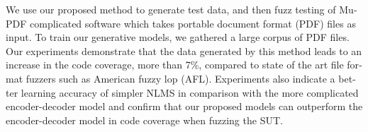 \begin{latin}
{		We use our proposed method to generate test data, and then fuzz testing of MuPDF complicated software which takes portable document format (PDF) files as input. 
		To train our generative models, we gathered a large corpus of PDF files.
		Our experiments demonstrate that the data generated by this method leads to an increase in the code coverage, more than 7\%, compared to state of the art file format fuzzers such as American fuzzy lop (AFL). Experiments also indicate a better learning accuracy of simpler NLMS in comparison with the more complicated encoder-decoder model and confirm that our proposed models can outperform the encoder-decoder model in code coverage when fuzzing the SUT.
	}
\latinfirstPage

\end{latin}
